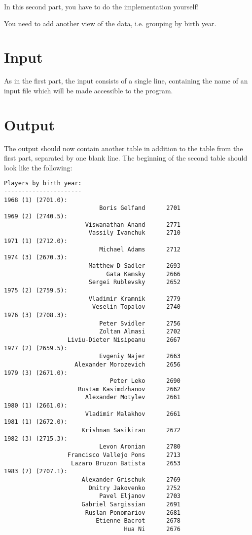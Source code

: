 
In this second part, you have to do the implementation yourself!

You need to add another view of the data, i.e. grouping by birth year.

\section*{Input}

As in the first part, the input consists of a single line,
containing the name of an input file
which will be made accessible to the program.


\section*{Output}

The output should now contain another table
in addition to the table from the first part,
separated by one blank line.
The beginning of the second table should look like the following:

\begin{verbatim}
Players by birth year:
----------------------
1968 (1) (2701.0):
                           Boris Gelfand      2701
1969 (2) (2740.5):
                       Viswanathan Anand      2771
                        Vassily Ivanchuk      2710
1971 (1) (2712.0):
                           Michael Adams      2712
1974 (3) (2670.3):
                        Matthew D Sadler      2693
                             Gata Kamsky      2666
                        Sergei Rublevsky      2652
1975 (2) (2759.5):
                        Vladimir Kramnik      2779
                         Veselin Topalov      2740
1976 (3) (2708.3):
                           Peter Svidler      2756
                           Zoltan Almasi      2702
                  Liviu-Dieter Nisipeanu      2667
1977 (2) (2659.5):
                           Evgeniy Najer      2663
                    Alexander Morozevich      2656
1979 (3) (2671.0):
                              Peter Leko      2690
                     Rustam Kasimdzhanov      2662
                       Alexander Motylev      2661
1980 (1) (2661.0):
                       Vladimir Malakhov      2661
1981 (1) (2672.0):
                      Krishnan Sasikiran      2672
1982 (3) (2715.3):
                           Levon Aronian      2780
                  Francisco Vallejo Pons      2713
                   Lazaro Bruzon Batista      2653
1983 (7) (2707.1):
                      Alexander Grischuk      2769
                        Dmitry Jakovenko      2752
                           Pavel Eljanov      2703
                      Gabriel Sargissian      2691
                       Ruslan Ponomariov      2681
                          Etienne Bacrot      2678
                                  Hua Ni      2676
\end{verbatim}
